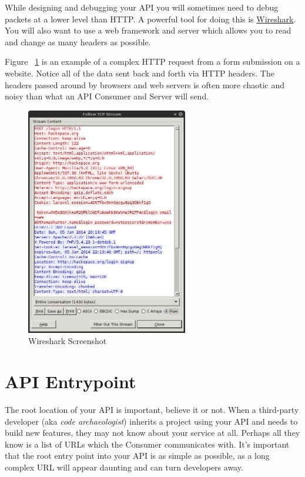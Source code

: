 \documentclass{book}
\begin{document}
While designing and debugging your API you will sometimes need to debug packets at a lower level than HTTP. A powerful tool for doing this is \href{https://www.wireshark.org}{Wireshark}. You will also want to use a web framework and server which allows you to read and change as many headers as possible.

Figure ~\ref{fig:wireshark} is an example of a complex HTTP request from a form submission on a website. Notice all of the data sent back and forth via HTTP headers. The headers passed around by browsers and web servers is often more chaotic and noisy than what an API Consumer and Server will send.

\begin{figure}[ht!]
\centering
\includegraphics[height=100mm]{images/wireshark.png}
\caption{Wireshark Screenshot}
\label{fig:wireshark}
\end{figure}


\section{API Entrypoint}

The root location of your API is important, believe it or not. When a third-party developer (aka \emph{code archaeologist}) inherits a project using your API and needs to build new features, they may not know about your service at all. Perhaps all they know is a list of URLs which the Consumer communicates with. It's important that the root entry point into your API is as simple as possible, as a long complex URL will appear daunting and can turn developers away.
\end{document}
